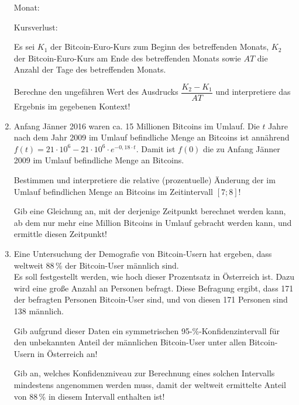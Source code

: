\begin{langesbeispiel}
\begin{enumerate}
	Monat:\,\leer
	
	Kursverlust:\,
	
	Es sei $K_1$ der Bitcoin-Euro-Kurs zum Beginn des betreffenden Monats, $K_2$ der Bitcoin-Euro-Kurs am Ende des betreffenden Monats sowie $AT$ die Anzahl der Tage des betreffenden Monats.
	
	Berechne den ungefähren Wert des Ausdrucks $\dfrac{K_2-K_1}{AT}$ und interpretiere das Ergebnis im gegebenen Kontext!
	
	\item Anfang Jänner 2016 waren ca. 15 Millionen Bitcoins im Umlauf. Die $t$ Jahre nach dem Jahr 2009 im Umlauf befindliche Menge an Bitcoins ist annährend $f(t)=21\cdot 10^6-21\cdot 10^6\cdot e^{-0,18\cdot t}$. Damit ist $f(0)$ die zu Anfang Jänner 2009 im Umlauf befindliche Menge an Bitcoins.
	
	Bestimmen und interpretiere die relative (prozentuelle) Änderung der im Umlauf befindlichen Menge an Bitcoins im Zeitintervall $[7;8]$!
	
	Gib eine Gleichung an, mit der derjenige Zeitpunkt berechnet werden kann, ab dem nur mehr eine Million Bitcoins in Umlauf gebracht werden kann, und ermittle diesen Zeitpunkt!
	
	\item Eine Untersuchung der Demografie von Bitcoin-Usern hat ergeben, dass weltweit 88\,\% der Bitcoin-User männlich sind.\\
Es soll festgestellt werden, wie hoch dieser Prozentsatz in Österreich ist. Dazu wird eine große Anzahl an Personen befragt. Diese Befragung ergibt, dass 171 der befragten Personen Bitcoin-User sind, und von diesen 171 Personen sind 138 männlich.

 Gib aufgrund dieser Daten ein symmetrischen 95-\%-Konfidenzintervall für den unbekannten Anteil der männlichen Bitcoin-User unter allen Bitcoin-Usern in Österreich an!

Gib an, welches Konfidenzniveau zur Berechnung eines solchen Intervalls mindestens angenommen werden muss, damit der weltweit ermittelte Anteil von 88\,\% in diesem Intervall enthalten ist!

	\end{enumerate}
	
\end{langesbeispiel}
